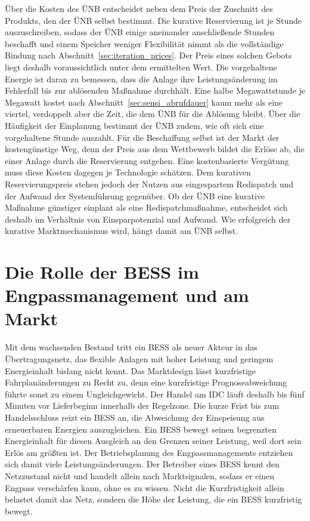 Über die Kosten des \ac{ÜNB} entscheidet neben dem Preis der Zuschnitt des Produkts, den der \ac{ÜNB} selbst bestimmt.
Die kurative Reservierung ist je Stunde auszuschreiben, sodass der \ac{ÜNB} einige aneinander anschließende Stunden beschafft und einem Speicher weniger Flexibilität nimmt als die vollständige Bindung nach Abschnitt~\ref{sec:iteration_prices}.
Der Preis eines solchen Gebots liegt deshalb voraussichtlich unter dem ermittelten Wert.
Die vorgehaltene Energie ist daran zu bemessen, dass die Anlage ihre Leistungsänderung im Fehlerfall bis zur ablösenden Maßnahme durchhält.
Eine halbe Megawattstunde je Megawatt kostet nach Abschnitt~\ref{sec:sensi_abrufdauer} kaum mehr als eine viertel, verdoppelt aber die Zeit, die dem \ac{ÜNB} für die Ablösung bleibt.
Über die Häufigkeit der Einplanung bestimmt der \ac{ÜNB} zudem, wie oft sich eine vorgehaltene Stunde auszahlt.
Für die Beschaffung selbst ist der Markt der kostengünstige Weg, denn der Preis aus dem Wettbewerb bildet die Erlöse ab, die einer Anlage durch die Reservierung entgehen.
Eine kostenbasierte Vergütung muss diese Kosten dagegen je Technologie schätzen.
Dem kurativen Reservierungspreis stehen jedoch der Nutzen aus eingespartem Redispatch und der Aufwand der Systemführung gegenüber.
Ob der \ac{ÜNB} eine kurative Maßnahme günstiger einplant als eine Redispatchmaßnahme, entscheidet sich deshalb im Verhältnis von Einsparpotenzial und Aufwand.
Wie erfolgreich der kurative Marktmechanismus wird, hängt damit am \ac{ÜNB} selbst.

\section{Die Rolle der \acs{BESS} im Engpassmanagement und am Markt}
\label{sec:bess_markets}

Mit dem wachsenden Bestand tritt ein \ac{BESS} als neuer Akteur in das Übertragungsnetz, das flexible Anlagen mit hoher Leistung und geringem Energieinhalt bislang nicht kennt.
Das Marktdesign lässt kurzfristige Fahrplanänderungen zu Recht zu, denn eine kurzfristige Prognoseabweichung führte sonst zu einem Ungleichgewicht.
Der Handel am \ac{IDC} läuft deshalb bis fünf Minuten vor Lieferbeginn innerhalb der Regelzone.
Die kurze Frist bis zum Handelsschluss reizt ein \ac{BESS} an, die Abweichung der Einspeisung aus erneuerbaren Energien auszugleichen.
Ein \ac{BESS} bewegt seinen begrenzten Energieinhalt für diesen Ausgleich an den Grenzen seiner Leistung, weil dort sein Erlös am größten ist.
Der Betriebsplanung des Engpassmanagements entziehen sich damit viele Leistungsänderungen.
Der Betreiber eines \ac{BESS} kennt den Netzzustand nicht und handelt allein nach Marktsignalen, sodass er einen Engpass verschärfen kann, ohne es zu wissen.
Nicht die Kurzfristigkeit allein belastet damit das Netz, sondern die Höhe der Leistung, die ein \ac{BESS} kurzfristig bewegt.


